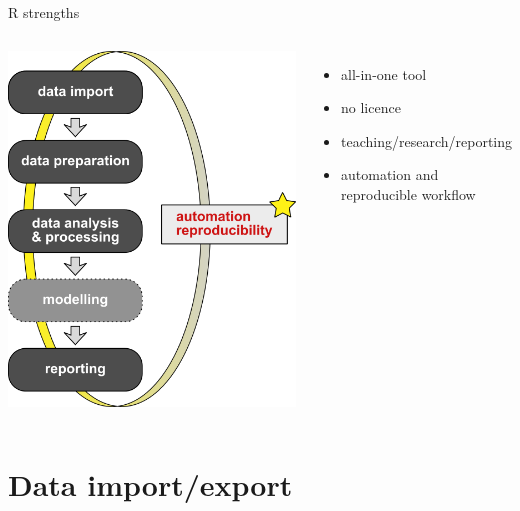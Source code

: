 \documentclass[9pt,ignorenonframetext,]{beamer}
\providecommand{\tightlist}{%
  \setlength{\itemsep}{0pt}\setlength{\parskip}{0pt}}
\newcommand{\columnsbegin}{\begin{columns}}
\newcommand{\columnsend}{\end{columns}}
\begin{document}
\begin{frame}{R strengths}

\columnsbegin


\includegraphics{imgPres/workflow.png}


\begin{itemize}
\tightlist
\item
  all-in-one tool
\item
  no licence
\item
  teaching/research/reporting
\item
  automation and reproducible workflow
\end{itemize}

\columnsend

\end{frame}

\section{Data import/export}\label{data-importexport}
\end{document}
